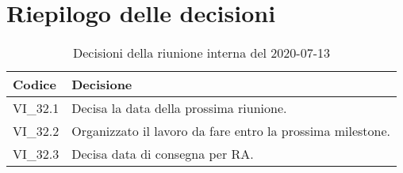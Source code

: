 \section{Riepilogo delle decisioni}
\begin{longtable}{ 
	 >{\centering}p{} >{}p{} }
	
	\caption{Decisioni della riunione interna del 2020-07-13}\\	
	
	\textbf{\color{white}Codice} & 
	\textbf{\color{white}Decisione} 
	\tabularnewline  
	\endhead
	
	VI\_32.1 & Decisa la data della prossima riunione. \\
	VI\_32.2 & Organizzato il lavoro da fare entro la prossima milestone. \\
	VI\_32.3 & Decisa data di consegna per RA. \\
\end{longtable}
